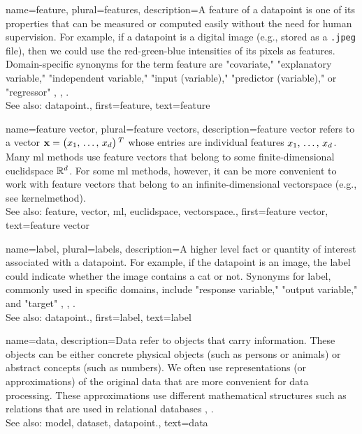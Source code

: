 {name={feature}, plural={features},
	description={A feature of a \gls{datapoint} is one of its properties that can be 
		measured or computed easily without the need for human supervision. For example, if a \gls{datapoint} 
		is a digital image (e.g., stored as a \texttt{.jpeg} file), then we could use the red-green-blue intensities 
		of its pixels as features. Domain-specific synonyms for the term feature are "covariate," "explanatory variable," 
		"independent variable," "input (variable)," "predictor (variable)," or "regressor" \cite{Gujarati2021}, \cite{Dodge2003}, \cite{Everitt2022}. 
				\\
		See also: \gls{datapoint}.}, 
	first={feature},
	text={feature}  
}

{name={feature vector}, plural={feature vectors},
	description={\Gls{feature} \gls{vector} refers to a \gls{vector} ${\bf x} = \big(x_{1}, \,\ldots, \,x_{d}\big)\,^{T}$ 
		whose entries are individual \glspl{feature} $x_{1}, \,\ldots, \,x_{d}$. Many \gls{ml} methods 
		use \gls{feature} \glspl{vector} that belong to some finite-dimensional \gls{euclidspace} $\mathbb{R}^{d}$. 
		For some \gls{ml} methods, however, it can be more convenient to work with \gls{feature} 
		\glspl{vector} that belong to an infinite-dimensional \gls{vectorspace} (e.g., see \gls{kernelmethod}). 
			\\
		See also: \gls{feature}, \gls{vector}, \gls{ml}, \gls{euclidspace}, \gls{vectorspace}.}, 
	first={feature vector},
	text={feature vector}  
}


{name={label}, plural={labels},
	description={A higher level fact or quantity of interest associated with a \gls{datapoint}. 
		For example, if the \gls{datapoint} is an image, the label could indicate whether the 
		image contains a cat or not. Synonyms for label, commonly used in specific domains, 
		include "response variable," "output variable," and "target" \cite{Gujarati2021}, \cite{Dodge2003}, \cite{Everitt2022}.
				\\
		See also: \gls{datapoint}.},
	first={label},
	text={label}  
}


{name={data},
	 description={Data refer to objects that carry information. These 
	 	objects can be either concrete physical objects (such as persons or animals) 
	 	or abstract concepts (such as numbers). We often use representations (or 
	 	approximations) of the original data that are more convenient for data processing. 
	 	These approximations use different mathematical structures such as relations 
		that are used in relational databases \cite{codd1970relational}, \cite{silberschatz2019database}.
				\\
		See also: \gls{model}, \gls{dataset}, \gls{datapoint}.}, 
	text={data}
}


